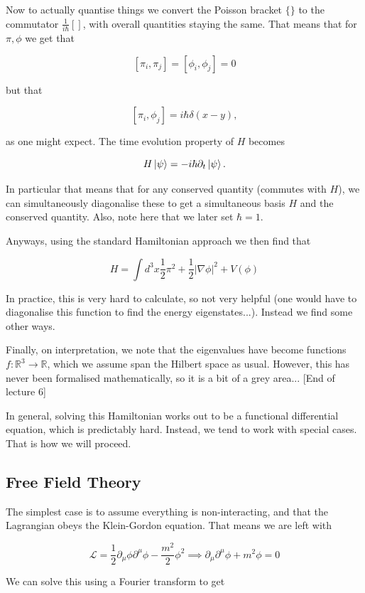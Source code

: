 \documentclass{article}
\theoremstyle{definition}
\begin{document}
Now to actually quantise things we convert the Poisson bracket $\{\}$ to the
commutator $\frac{1}{i\hbar} []$, with overall quantities staying the same. That
means that for $\pi, \phi$ we get that

$$ [\pi_i, \pi_j] = [\phi_i, \phi_j] = 0$$

but that

$$ [ \pi_i, \phi_j] = i\hbar \delta(x - y), $$

as one might expect. The time evolution property of $H$ becomes 

$$ H \ket{\psi} = -i \hbar \partial_t \ket{\psi}. $$

In particular that means that for any conserved quantity (commutes with $H$), we
can simultaneously diagonalise these to get a simultaneous basis $H$ and the
conserved quantity. Also, note here that we later set $\hbar = 1$.

Anyways, using the standard Hamiltonian approach we then find that

$$ H = \int d^3x \frac{1}{2} \pi^2 + \frac{1}{2} |\nabla \phi|^2 + V(\phi) $$

In practice, this is very hard to calculate, so not very helpful (one would have
to diagonalise this function to find the energy eigenstates...). Instead we find
some other ways.

Finally, on interpretation, we note that the eigenvalues have become functions
$f : \mathbb{R}^3 \to \mathbb{R}$, which we assume span the Hilbert space as
usual. However, this has never been formalised mathematically, so it is a bit of
a grey area... [End of lecture 6]

In general, solving this Hamiltonian works out to be a functional differential
equation, which is predictably hard. Instead, we tend to work with special
cases. That is how we will proceed.

\subsection{Free Field Theory}

The simplest case is to assume everything is non-interacting, and that the
Lagrangian obeys the Klein-Gordon equation. That means we are left with

$$ \mathcal{L} = \frac{1}{2} \partial_\mu \phi \partial^\mu \phi -
\frac{m^2}{2}\phi^2 \implies \partial_\mu \partial^\mu \phi + m^2 \phi = 0 $$

We can solve this using a Fourier transform to get
\end{document}
